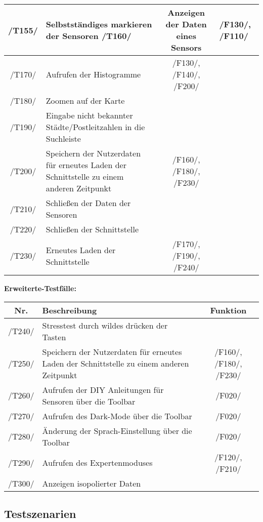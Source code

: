 \begin{tabularx}{\textwidth}{| c | X | c |}
     /T155/ & Selbstständiges markieren der Sensoren
     \hline
     /T160/ & Anzeigen der Daten eines Sensors &  /F130/, /F110/\\
     \hline
     /T170/ & Aufrufen der Histogramme & /F130/, /F140/, /F200/\\
     \hline
     /T180/ & Zoomen auf der Karte & \\
     \hline
     /T190/ & Eingabe nicht bekannter Städte/Postleitzahlen in die Suchleiste & \\
     \hline
     /T200/ & Speichern der Nutzerdaten für erneutes Laden der Schnittstelle zu einem anderen Zeitpunkt & /F160/, /F180/, /F230/ \\
     \hline
     /T210/ & Schließen der Daten der Sensoren& \\
     \hline
     /T220/ & Schließen der Schnittstelle & \\
     \hline
     /T230/ & Erneutes Laden der Schnittstelle & /F170/, /F190/, /F240/\\
     \hline
    \end{tabularx}

\textbf{Erweiterte-Testfälle:}
\begin{tabularx}{\textwidth}{| c | X | c |}
    \hline
    \textbf{Nr.} & 
    \textbf{Beschreibung} &
    \textbf{Funktion}\\
    \hline 
    /T240/ & Stresstest durch wildes drücken der Tasten & \\
    \hline      
    /T250/ & Speichern der Nutzerdaten für erneutes Laden der Schnittstelle zu einem anderen Zeitpunkt & /F160/, /F180/, /F230/ \\
    \hline  
    /T260/ & Aufrufen der DIY Anleitungen für Sensoren über die Toolbar & /F020/\\
    \hline
    /T270/ & Aufrufen des Dark-Mode über die Toolbar & /F020/\\
    \hline
    /T280/ & Änderung der Sprach-Einstellung über die Toolbar & /F020/\\
    \hline
    /T290/ & Aufrufen des Expertenmoduses & /F120/, /F210/\\
    \hline
    /T300/ & Anzeigen isopolierter Daten & \\
\end{tabularx}

\subsection{Testszenarien}

